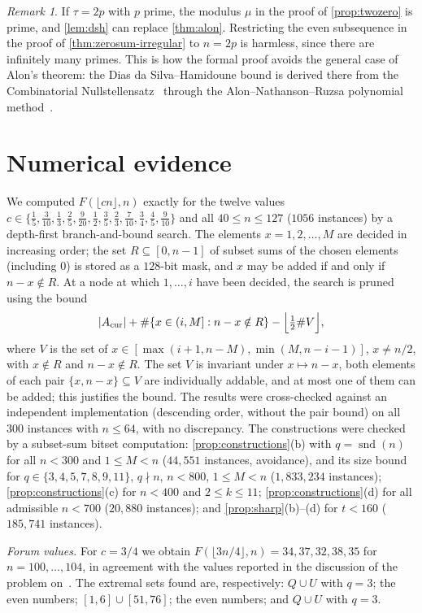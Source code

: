 \documentclass[11pt,reqno]{amsart}
\numberwithin{equation}{section}
\theoremstyle{definition}
\theoremstyle{remark}
\newtheorem{remark}[theorem]{Remark}
\newcommand{\card}[1]{\lvert #1\rvert}
\newcommand{\floor}[1]{\lfloor #1\rfloor}
\newcommand{\snd}{\operatorname{snd}}
\begin{document}
\begin{remark}
If $\tau=2p$ with $p$ prime, the modulus $\mu$ in the proof of \cref{prop:twozero} is prime, and \cref{lem:dsh} can replace \cref{thm:alon}. Restricting the even subsequence in the proof of \cref{thm:zerosum-irregular} to $n=2p$ is harmless, since there are infinitely many primes. This is how the formal proof avoids the general case of Alon's theorem: the Dias da Silva--Hamidoune bound is derived there from the Combinatorial Nullstellensatz~\cite{Al99} through the Alon--Nathanson--Ruzsa polynomial method~\cite{ANR96}.
\end{remark}

\section{Numerical evidence}\label{sec:numerics}

We computed $F(\floor{cn},n)$ exactly for the twelve values $c\in\{\frac15,\frac3{10},\frac13,\frac25,\frac9{20},\frac12,\frac35,\frac23,\frac7{10},\frac34,\frac45,\frac9{10}\}$ and all $40\le n\le127$ ($1056$ instances) by a depth-first branch-and-bound search. The elements $x=1,2,\dots,M$ are decided in increasing order; the set $R\subseteq[0,n-1]$ of subset sums of the chosen elements (including $0$) is stored as a $128$-bit mask, and $x$ may be added if and only if $n-x\notin R$. At a node at which $1,\dots,i$ have been decided, the search is pruned using the bound
\[
 \card{A_{\mathrm{cur}}}+\#\{x\in(i,M]:n-x\notin R\}-\Bigl\lfloor\tfrac12\#V\Bigr\rfloor,
\]
where $V$ is the set of $x\in[\max(i+1,n-M),\min(M,n-i-1)]$, $x\ne n/2$, with $x\notin R$ and $n-x\notin R$. The set $V$ is invariant under $x\mapsto n-x$, both elements of each pair $\{x,n-x\}\subseteq V$ are individually addable, and at most one of them can be added; this justifies the bound. The results were cross-checked against an independent implementation (descending order, without the pair bound) on all $300$ instances with $n\le64$, with no discrepancy. The constructions were checked by a subset-sum bitset computation: \cref{prop:constructions}(b) with $q=\snd(n)$ for all $n<300$ and $1\le M<n$ ($44{,}551$ instances, avoidance), and its size bound for $q\in\{3,4,5,7,8,9,11\}$, $q\nmid n$, $n<800$, $1\le M<n$ ($1{,}833{,}234$ instances); \cref{prop:constructions}(c) for $n<400$ and $2\le k\le11$; \cref{prop:constructions}(d) for all admissible $n<700$ ($20{,}880$ instances); and \cref{prop:sharp}(b)--(d) for $t<160$ ($185{,}741$ instances).

\emph{Forum values.} For $c=3/4$ we obtain $F(\floor{3n/4},n)=34,37,32,38,35$ for $n=100,\dots,104$, in agreement with the values reported in the discussion of the problem on~\cite{Bl}. The extremal sets found are, respectively: $Q\cup U$ with $q=3$; the even numbers; $[1,6]\cup[51,76]$; the even numbers; and $Q\cup U$ with $q=3$.
\end{document}
